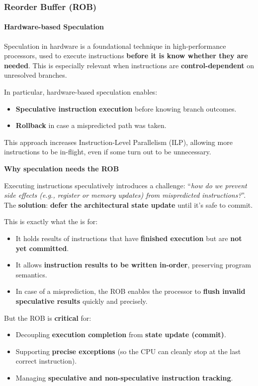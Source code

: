 \subsubsection{Reorder Buffer (ROB)}

\paragraph{Hardware-based Speculation}

Speculation in hardware is a foundational technique in high-performance processors, used to execute instructions \textbf{before it is know whether they are needed}. This is especially relevant when instructions are \textbf{control-dependent} on unresolved branches.

\highspace
In particular, hardware-based speculation enables:
\begin{itemize}
    \item \textbf{Speculative instruction execution} before knowing branch outcomes.
    \item \textbf{Rollback} in case a mispredicted path was taken.
\end{itemize}
This approach increases Instruction-Level Parallelism (ILP), allowing more instructions to be in-flight, even if some turn out to be unnecessary.

\highspace
\begin{flushleft}
    \textcolor{Green3}{ \textbf{Why speculation needs the ROB}}
\end{flushleft}
Executing instructions speculatively introduces a challenge: ``\emph{how do we prevent side effects (e.g., register or memory updates) from mispredicted instructions?}''. The \textbf{solution}: \textbf{defer the architectural state update} until it's safe to commit.

\highspace
This is exactly what the  is for:
\begin{itemize}[label=\textcolor{Green3}{}]
    \item It holds results of instructions that have \textbf{finished execution} but are \textbf{not yet committed}.
    \item It allows \textbf{instruction results to be written in-order}, preserving program semantics.
    \item In case of a misprediction, the ROB enables the processor to \textbf{flush invalid speculative results} quickly and precisely.
\end{itemize}
But the ROB is \textbf{critical} for:
\begin{itemize}[label=\textcolor{Red2}{}]
    \item Decoupling \textbf{execution completion} from \textbf{state update (commit)}.
    \item Supporting \textbf{precise exceptions} (so the CPU can cleanly stop at the last correct instruction).
    \item Managing \textbf{speculative and non-speculative instruction tracking}.
\end{itemize}
